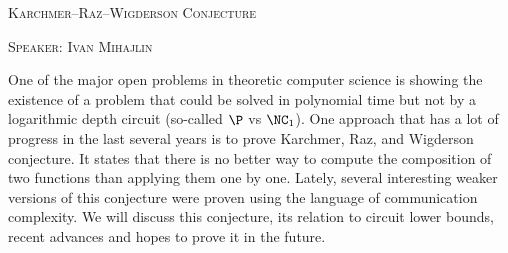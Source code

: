 \begin{center}
    \textsc{Karchmer--Raz--Wigderson Conjecture}

    \textsc{Speaker: Ivan Mihajlin}
\end{center}


One of the major open problems in theoretic computer science is showing the existence of a problem that
could be solved in polynomial time but not by a logarithmic depth circuit (so-called $\P$ vs
$\NC_1$). One approach that has a lot of progress in the last several years is to prove Karchmer, Raz,
and Wigderson conjecture. It states that there is no better way to compute the composition of two
functions than applying them one by one. Lately, several interesting weaker versions of this conjecture
were proven using the language of communication complexity. We will discuss this conjecture, its relation
to circuit lower bounds, recent advances and hopes to prove it in the future.
